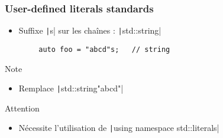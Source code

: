 \documentclass[C++.tex]{subfiles}
\begin{document}
\begin{frame}[fragile]
	\frametitle{User-defined literals standards}
	\begin{itemize}
		\item Suffixe \texttt|s| sur les chaînes : \texttt|std::string|
	\end{itemize}

	\begin{verbatim}
		auto foo = "abcd"s;   // string
	\end{verbatim}

	\begin{block}{Note}
		\begin{itemize}
			\item Remplace \texttt|std::string{"abcd"}|
		\end{itemize}
	\end{block}

	\begin{alertblock}{Attention}
		\begin{itemize}
			\item Nécessite l'utilisation de \texttt|using namespace std::literals|
		\end{itemize}

	\end{alertblock}


\end{frame}
\end{document}
